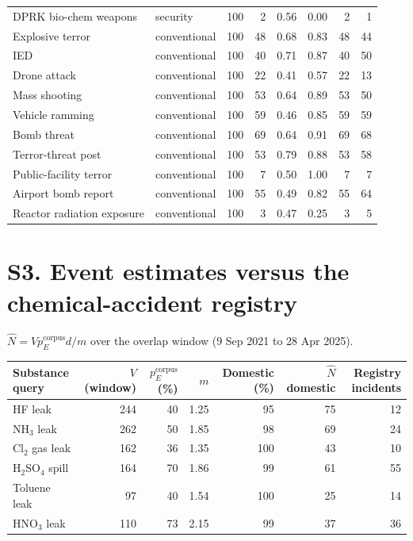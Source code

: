 \documentclass[11pt]{article}
\begin{document}
{\begin{tabular}{llrrrrrr}
DPRK bio-chem weapons & security & 100 & 2 & 0.56 & 0.00 & 2 & 1 \\
Explosive terror & conventional & 100 & 48 & 0.68 & 0.83 & 48 & 44 \\
IED & conventional & 100 & 40 & 0.71 & 0.87 & 40 & 50 \\
Drone attack & conventional & 100 & 22 & 0.41 & 0.57 & 22 & 13 \\
Mass shooting & conventional & 100 & 53 & 0.64 & 0.89 & 53 & 50 \\
Vehicle ramming & conventional & 100 & 59 & 0.46 & 0.85 & 59 & 59 \\
Bomb threat & conventional & 100 & 69 & 0.64 & 0.91 & 69 & 68 \\
Terror-threat post & conventional & 100 & 53 & 0.79 & 0.88 & 53 & 58 \\
Public-facility terror & conventional & 100 & 7 & 0.50 & 1.00 & 7 & 7 \\
Airport bomb report & conventional & 100 & 55 & 0.49 & 0.82 & 55 & 64 \\
Reactor radiation exposure & conventional & 100 & 3 & 0.47 & 0.25 & 3 & 5 \\
\bottomrule\end{tabular}}

\section*{S3. Event estimates versus the chemical-accident registry}
$\hat N = V p_E^{\mathrm{corpus}} d / m$ over the overlap window (9 Sep 2021 to 28 Apr 2025).\\[4pt]
{\small\setlength{\tabcolsep}{4pt}
\begin{tabular}{lrrrrrr}\toprule Substance query & $V$ (window) & $p_E^{\mathrm{corpus}}$ (\%) & $m$ & Domestic (\%) & $\hat N$ domestic & Registry incidents \\\midrule
HF leak & 244 & 40 & 1.25 & 95 & 75 & 12 \\
NH$_3$ leak & 262 & 50 & 1.85 & 98 & 69 & 24 \\
Cl$_2$ gas leak & 162 & 36 & 1.35 & 100 & 43 & 10 \\
H$_2$SO$_4$ spill & 164 & 70 & 1.86 & 99 & 61 & 55 \\
Toluene leak & 97 & 40 & 1.54 & 100 & 25 & 14 \\
HNO$_3$ leak & 110 & 73 & 2.15 & 99 & 37 & 36 \\
\bottomrule\end{tabular}}
\end{document}
